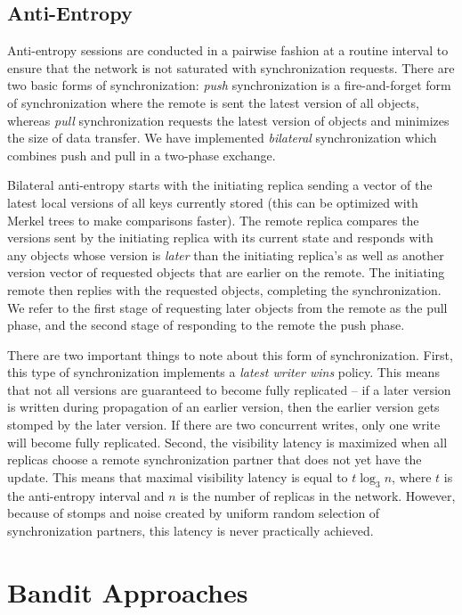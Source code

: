 \subsection*{Anti-Entropy}

Anti-entropy sessions are conducted in a pairwise fashion at a routine
interval to ensure that the network is not saturated with synchronization
requests.
There are two basic forms of synchronization: \textit{push} synchronization
is a fire-and-forget form of synchronization where the remote is sent the
latest version of all objects, whereas \textit{pull} synchronization requests
the latest version of objects and minimizes the size of data transfer.
We have implemented \textit{bilateral} synchronization which combines push
and pull in a two-phase exchange.

Bilateral anti-entropy starts with the initiating replica sending a vector of
the latest local versions of all keys currently stored (this can be optimized
with Merkel trees to make comparisons faster).
The remote replica compares the versions sent by the initiating replica with
its current state and responds with any objects whose version is \textit{later} than
the initiating replica's as well as another version vector of requested
objects that are earlier on the remote.
The initiating remote then replies with the requested objects, completing the
synchronization.
We refer to the first stage of requesting later objects from the remote as
the pull phase, and the second stage of responding to the remote the push
phase.

There are two important things to note about this form of synchronization.
First, this type of synchronization implements a \textit{latest writer wins}
policy.
This means that not all versions are guaranteed to become fully replicated
-- if a later version is written during propagation of an earlier version,
then the earlier version gets stomped by the later version.
If there are two concurrent writes, only one write will become fully
replicated.
Second, the visibility latency is maximized when all replicas choose a remote
synchronization partner that does not yet have the update.
This means that maximal visibility latency is equal to $t\log_3n$, where
$t$ is the anti-entropy interval and $n$ is the number of replicas in the
network.
However, because of stomps and noise created by uniform random selection of
synchronization partners, this latency is never practically achieved.

\section*{Bandit Approaches}

